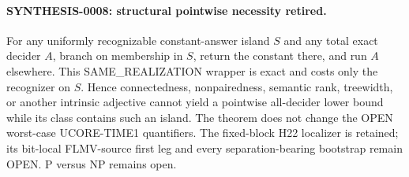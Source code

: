 \paragraph{SYNTHESIS-0008: structural pointwise necessity retired.}
For any uniformly recognizable constant-answer island $S$ and any total
exact decider $A$, branch on membership in $S$, return the constant there,
and run $A$ elsewhere.  This SAME\_REALIZATION wrapper is exact and costs
only the recognizer on $S$.  Hence connectedness, nonpairedness, semantic
rank, treewidth, or another intrinsic adjective cannot yield a pointwise
all-decider lower bound while its class contains such an island.  The theorem
does not change the OPEN worst-case UCORE-TIME1 quantifiers.  The fixed-block
H22 localizer is retained; its bit-local FLMV-source first leg and every
separation-bearing bootstrap remain OPEN.  P versus NP remains open.


